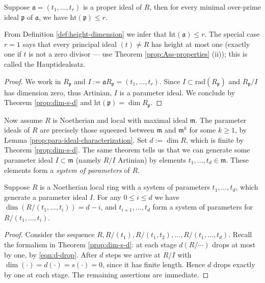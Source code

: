 \begin{theorem}[Krull]
	Suppose $\mathfrak{a} = (t_1, \ldots, t_r)$ is a proper ideal of $R$, then for every minimal over-prime ideal $\mathfrak{p}$ of $\mathfrak{a}$, we have $\text{ht}(\mathfrak{p}) \leq r$.
\end{theorem}
From Definition \ref{def:height-dimension} we infer that $\text{ht}(\mathfrak{a}) \leq r$. The special case $r=1$ says that every principal ideal $(t) \neq R$ has height at most one (exactly one if $t$ is not a zero divisor --- use Theorem \ref{prop:Ass-properties} (ii)); this is called the Hauptidealsatz.
\begin{proof}
	We work in $R_{\mathfrak{p}}$ and $I := \mathfrak{a} R_{\mathfrak{p}} = (t_1, \ldots, t_r)$. Since $I \subset \text{rad}(R_{\mathfrak{p}})$ and $R_{\mathfrak{p}}/I$ has dimension zero, thus Artinian, $I$ is a parameter ideal. We conclude by Theorem \ref{prop:dim-s-d} and $\text{ht}(\mathfrak{p}) = \dim R_{\mathfrak{p}}$.
\end{proof}

Now assume $R$ is Noetherian and local with maximal ideal $\mathfrak{m}$. The parameter ideals of $R$ are precisely those squeezed between $\mathfrak{m}$ and $\mathfrak{m}^k$ for some $k \geq 1$, by Lemma \ref{prop:para-ideal-characterization}. Set $d := \dim R$, which is finite by Theorem \ref{prop:dim-s-d}. The same theorem tells us that we can generate some parameter ideal $I \subset \mathfrak{m}$ (namely $R/I$ Artinian) by elements $t_1, \ldots, t_d \in \mathfrak{m}$. These elements form a \emph{system of parameters} of $R$.

\begin{proposition}\label{prop:system-parameter}
	Suppose $R$ is a Noetherian local ring with a system of parameters $t_1, \ldots, t_d$, which generate a parameter ideal $I$. For any $0 \leq i \leq d$ we have $\dim(R/(t_1, \ldots, t_i)) = d-i$, and $t_{i+1}, \ldots, t_d$ form a system of parameters for $R/(t_1, \ldots, t_i)$.
\end{proposition}
\begin{proof}
	Consider the sequence $R, R/(t_1), R/(t_1, t_2), \ldots, R/(t_1, \ldots, t_d)$. Recall the formalism in Theorem \ref{prop:dim-s-d}: at each stage $d(R/\cdots)$ drops at most by one, by \eqref{eqn:d-drop}. After $d$ steps we arrive at $R/I$ with $\dim(\cdot)=d(\cdot)=s(\cdot)=0$, since it has finite length. Hence $d$ drops exactly by one at each stage. The remaining assertions are immediate.
\end{proof}

